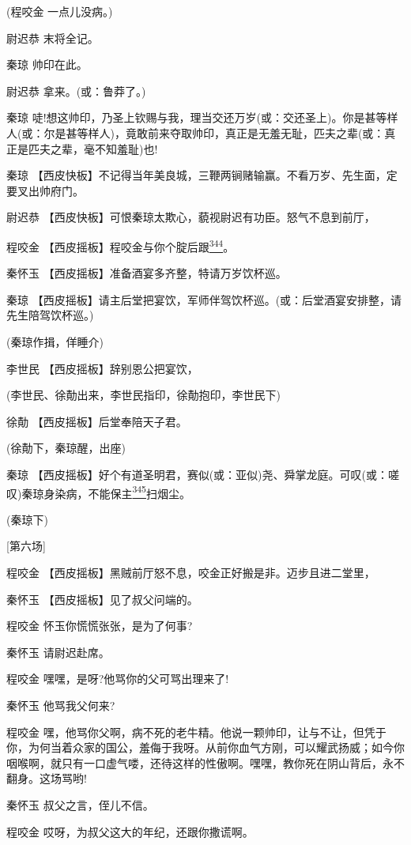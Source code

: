 (程咬金 一点儿没病。)

尉迟恭 末将全记。

秦琼 帅印在此。

尉迟恭 拿来。(或：鲁莽了。)

秦琼
唗!想这帅印，乃圣上钦赐与我，理当交还万岁(或：交还圣上)。你是甚等样人(或：尔是甚等样人)，竟敢前来夺取帅印，真正是无羞无耻，匹夫之辈(或：真正是匹夫之辈，毫不知羞耻)也!

秦琼
【西皮快板】不记得当年美良城，三鞭两锏赌输赢。不看万岁、先生面，定要叉出帅府门。

尉迟恭 【西皮快板】可恨秦琼太欺心，藐视尉迟有功臣。怒气不息到前厅，

程咬金
【西皮摇板】程咬金与你个腚后跟\protect\hyperlink{fn344}{\textsuperscript{344}}。

秦怀玉 【西皮摇板】准备酒宴多齐整，特请万岁饮杯巡。

秦琼
【西皮摇板】请主后堂把宴饮，军师伴驾饮杯巡。(或：后堂酒宴安排整，请先生陪驾饮杯巡。)

(秦琼作揖，佯睡介)

李世民 【西皮摇板】辞别恩公把宴饮，

(李世民、徐勣出来，李世民指印，徐勣抱印，李世民下)

徐勣 【西皮摇板】后堂奉陪天子君。

(徐勣下，秦琼醒，出座)

秦琼
【西皮摇板】好个有道圣明君，赛似(或：亚似)尧、舜掌龙庭。可叹(或：嗟叹)秦琼身染病，不能保主\protect\hyperlink{fn345}{\textsuperscript{345}}扫烟尘。

(秦琼下)

{[}第六场{]}

程咬金 【西皮摇板】黑贼前厅怒不息，咬金正好搬是非。迈步且进二堂里，

秦怀玉 【西皮摇板】见了叔父问端的。

程咬金 怀玉你慌慌张张，是为了何事?

秦怀玉 请尉迟赴席。

程咬金 嘿嘿，是呀?他骂你的父可骂出理来了!

秦怀玉 他骂我父何来?

程咬金
嘿，他骂你父啊，病不死的老牛精。他说一颗帅印，让与不让，但凭于你，为何当着众家的国公，羞侮于我呀。从前你血气方刚，可以耀武扬威；如今你咽喉啊，就只有一口虚气喽，还待这样的性傲啊。嘿嘿，教你死在阴山背后，永不翻身。这场骂哟!

秦怀玉 叔父之言，侄儿不信。

程咬金 哎呀，为叔父这大的年纪，还跟你撒谎啊。

